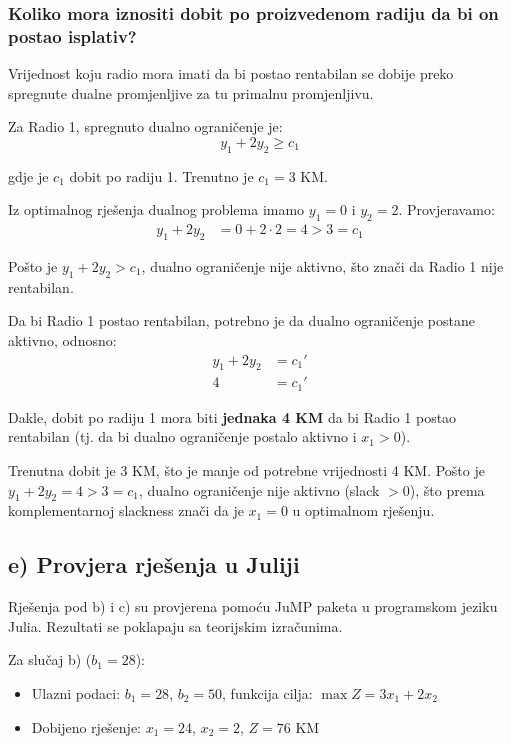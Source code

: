 \documentclass[12pt,a4paper]{article}
\begin{document}
\subsubsection{Koliko mora iznositi dobit po proizvedenom radiju da bi on postao isplativ?}

Vrijednost koju radio mora imati da bi postao rentabilan se dobije preko spregnute dualne promjenljive za tu primalnu promjenljivu.

Za Radio 1, spregnuto dualno ograničenje je:
\begin{equation}
y_1 + 2y_2 \geq c_1
\end{equation}

gdje je $c_1$ dobit po radiju 1. Trenutno je $c_1 = 3$ KM.

Iz optimalnog rješenja dualnog problema imamo $y_1 = 0$ i $y_2 = 2$. Provjeravamo:
\begin{align}
y_1 + 2y_2 &= 0 + 2 \cdot 2 = 4 > 3 = c_1
\end{align}

Pošto je $y_1 + 2y_2 > c_1$, dualno ograničenje nije aktivno, što znači da Radio 1 nije rentabilan.

Da bi Radio 1 postao rentabilan, potrebno je da dualno ograničenje postane aktivno, odnosno:
\begin{align}
y_1 + 2y_2 &= c_1' \\
4 &= c_1'
\end{align}

Dakle, dobit po radiju 1 mora biti \textbf{jednaka 4 KM} da bi Radio 1 postao rentabilan (tj. da bi dualno ograničenje postalo aktivno i $x_1 > 0$). 

Trenutna dobit je 3 KM, što je manje od potrebne vrijednosti 4 KM. Pošto je $y_1 + 2y_2 = 4 > 3 = c_1$, dualno ograničenje nije aktivno (slack $> 0$), što prema komplementarnoj slackness znači da je $x_1 = 0$ u optimalnom rješenju.

\subsection{e) Provjera rješenja u Juliji}

Rješenja pod b) i c) su provjerena pomoću JuMP paketa u programskom jeziku Julia. Rezultati se poklapaju sa teorijskim izračunima.

Za slučaj b) ($b_1 = 28$):
\begin{itemize}
\item Ulazni podaci: $b_1 = 28$, $b_2 = 50$, funkcija cilja: $\max Z = 3x_1 + 2x_2$
\item Dobijeno rješenje: $x_1 = 24$, $x_2 = 2$, $Z = 76$ KM
\end{itemize}
\end{document}
